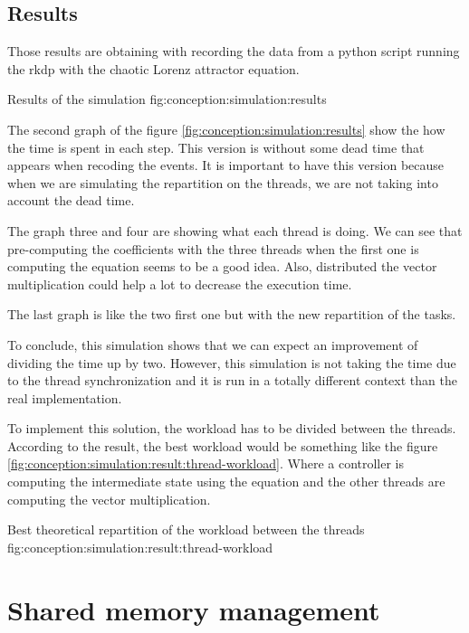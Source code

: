 \subsection{Results}
\label{ch:conception:simulation:results}

Those results are obtaining with recording the data from a python script running
the \acrshort{rkdp} with the chaotic Lorenz attractor equation.

        {Results of the simulation}
        {fig:conception:simulation:results}

The second graph of the figure \ref{fig:conception:simulation:results} show the
how the time is spent in each step.
This version is without some dead time that appears when recoding the events.
It is important to have this version because when we are simulating the
repartition on the threads, we are not taking into account the dead time.

The graph three and four are showing what each thread is doing.
We can see that pre-computing the coefficients with the three threads when the
first one is computing the equation seems to be a good idea.
Also, distributed the vector multiplication could help a lot to decrease the
execution time.

The last graph is like the two first one but with the new repartition of the
tasks.

To conclude, this simulation shows that we can expect an improvement of dividing
the time up by two.
However, this simulation is not taking the time due to the thread
synchronization and it is run in a totally different context than the real
implementation.

To implement this solution, the workload has to be divided between the threads.
According to the result, the best workload would be something like the figure
\ref{fig:conception:simulation:result:thread-workload}.
Where a controller is computing the intermediate state using the equation and the
other threads are computing the vector multiplication.

        {Best theoretical repartition of the workload between the threads}
        {fig:conception:simulation:result:thread-workload}


\section{Shared memory management}
\label{ch:conception:shared}

